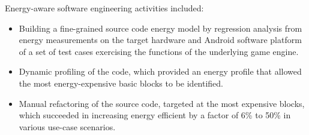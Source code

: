 \documentclass[11pt,oneside]{book}
\begin{document}
Energy-aware software engineering activities included:
\begin{itemize}
\item
Building a fine-grained source code energy model by regression
analysis from energy measurements on the target hardware and Android
software platform of a set of test cases exercising the functions of
the underlying game engine.

\item

Dynamic profiling of the code, which provided an energy profile that
allowed the most energy-expensive basic blocks to be identified.

\item Manual refactoring of the source code, targeted at the most
  expensive blocks, which succeeded in increasing energy efficient by
  a factor of 6\% to 50\% in various use-case scenarios.
\end{itemize}



\end{document}
